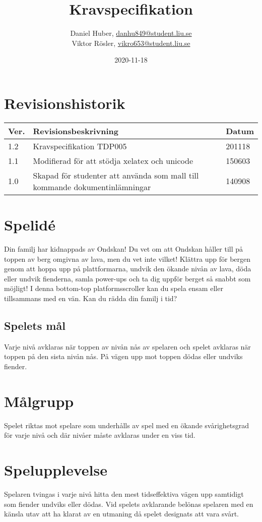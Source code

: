 \documentclass{TDP005mall}
\author{Daniel Huber, \url{danhu849@student.liu.se}\\
  Viktor Rösler, \url{vikro653@student.liu.se}}
\title{Kravspecifikation}
\date{2020-11-18}
\begin{document}
\projectpage
\tableofcontents
\section{Revisionshistorik}
\begin{table}[!h]
\begin{tabularx}{\linewidth}{|l|X|l|}
\hline
Ver. & Revisionsbeskrivning & Datum \\\hline
1.2 & Kravspecifikation TDP005 & 201118 \\\hline
1.1 & Modifierad för att stödja xelatex och unicode & 150603 \\\hline
1.0 & Skapad för studenter att använda som mall till
kommande dokumentinlämningar & 140908 \\\hline
\end{tabularx}
\end{table}


\section{Spelid\'{e} }%
Din familj har kidnappads av Ondskan! Du vet om att Ondskan håller till på toppen av berg omgivna av lava, men du vet inte vilket! Klättra upp för bergen genom att hoppa upp på plattformarna, undvik den ökande nivån av lava, döda eller undvik fienderna, samla power-ups och ta dig uppför berget så snabbt som möjligt! I denna bottom-top platformsscroller kan du spela ensam eller tillsammans med en vän. Kan du rädda din familj i tid?

\subsection{Spelets mål}
Varje nivå avklaras när toppen av nivån nås av spelaren och spelet avklaras när toppen på den sista nivån nås. På vägen upp mot toppen dödas eller undviks fiender. 

\section{Målgrupp}%
Spelet riktas mot spelare som underhålls av spel med en ökande svårighetsgrad för varje nivå och där nivåer måste avklaras under en viss tid. 

\section{Spelupplevelse}%
Spelaren tvingas i varje nivå hitta den mest tidseffektiva vägen upp samtidigt som fiender undviks eller dödas. Vid spelets avklarande belönas spelaren med en känsla utav att ha klarat av en utmaning då spelet designats att vara svårt.  
\end{document}
